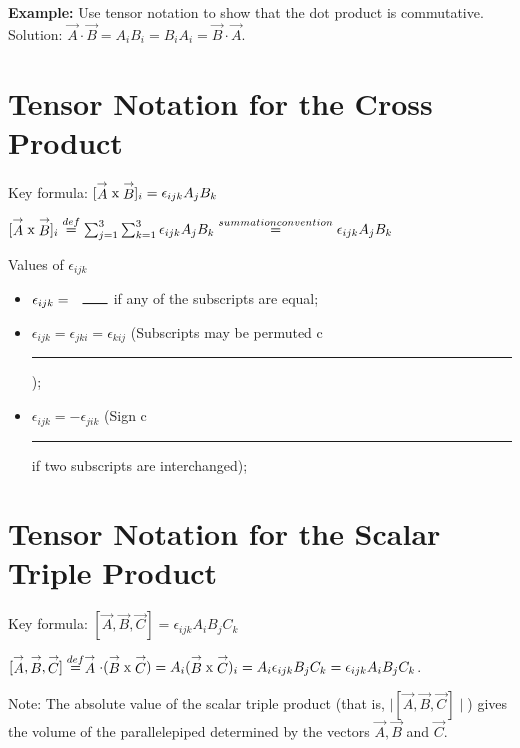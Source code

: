 {\bf \flushleft Example:} Use tensor notation to show that the dot product is commutative.
{\flushleft Solution:}  $\stackrel{\rightarrow}{A} \cdot \stackrel{\rightarrow}{B} = A_iB_i = B_iA_i = \stackrel{\rightarrow}{B} \cdot \stackrel{\rightarrow}{A} $.


\section{Tensor Notation for the Cross Product}
{\flushleft Key formula: $[\stackrel{\rightarrow}{A} \textup{x} \stackrel{\rightarrow}{B}]_i = \epsilon_{ijk}A_jB_k $ }

\vspace{.1in}
 $[\stackrel{\rightarrow}{A} \textup{x} \stackrel{\rightarrow}{B}]_i \stackrel{def}{=} \sum_{j=1}^3\sum_{k=1}^3\epsilon_{ijk}A_jB_k \stackrel{summation convention}{=} \epsilon_{ijk}A_jB_k$

 {\flushleft Values of $\epsilon_{ijk}$}
  \begin{itemize}
 \item $\epsilon_{ijk}= \hspace{.1in}\rule{.25in}{.01in}$ if any of the subscripts are equal;
 \item $\epsilon_{ijk}= \epsilon_{jki}=\epsilon_{kij}$  (Subscripts may be permuted c\hspace{.1in}\rule{.5in}{.01in});
 \item  $\epsilon_{ijk}= -\epsilon_{jik}$ (Sign  c\hspace{.1in}\rule{.5in}{.01in} if two subscripts are interchanged);
 \end{itemize}
\vspace{.2in}

\section{Tensor Notation for the Scalar Triple Product}
{\flushleft Key formula: $[\stackrel{\rightarrow}{A} , \stackrel{\rightarrow}{B} , \stackrel{\rightarrow}{C}]  =   \epsilon_{ijk}A_iB_jC_k$ }
\vspace{.1in}

$[\stackrel{\rightarrow}{A} , \stackrel{\rightarrow}{B} , \stackrel{\rightarrow}{C}]  \stackrel{def}{=}
\stackrel{\rightarrow}{A} \cdot (\stackrel{\rightarrow}{B} \textup{x} \stackrel{\rightarrow}{C})=
A_i (\stackrel{\rightarrow}{B} \textup{x} \stackrel{\rightarrow}{C})_i =
A_i \epsilon_{ijk}B_jC_k = \epsilon_{ijk}A_iB_jC_k$.

{\flushleft Note:} The absolute value of the scalar triple product (that is, $\mid  [\stackrel{\rightarrow}{A} , \stackrel{\rightarrow}{B} , \stackrel{\rightarrow}{C}]  \mid $) gives the volume of the parallelepiped determined by the vectors $\stackrel{\rightarrow}{A} , \stackrel{\rightarrow}{B}$ and  $\stackrel{\rightarrow}{C}$.


